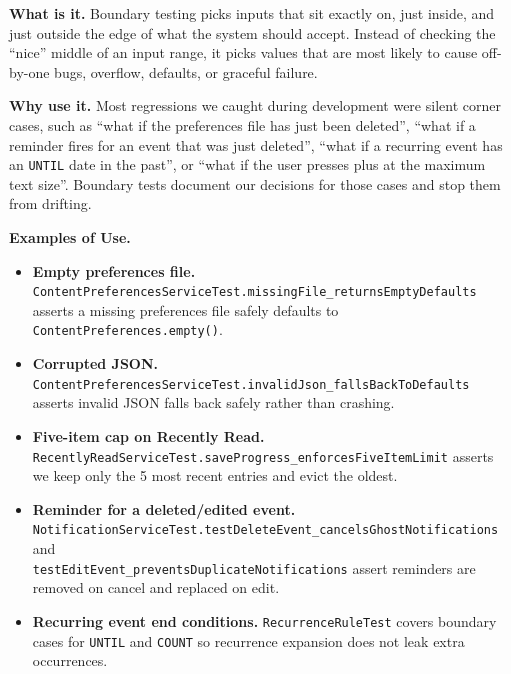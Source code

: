 \documentclass[a4paper, 12pt]{article}
\begin{document}
    \textbf{What is it.} Boundary testing picks inputs that sit exactly on, just
    inside, and just outside the edge of what the system should accept. Instead of
    checking the ``nice'' middle of an input range, it picks values that are
    most likely to cause off-by-one bugs, overflow, defaults, or graceful failure.

    \textbf{Why use it.} Most regressions we caught during development were
    silent corner cases, such as ``what if the preferences file has just been deleted'',
    ``what if a reminder fires for an event that was just deleted'', ``what if a
    recurring event has an \texttt{UNTIL} date in the past'', or ``what if the user
    presses plus at the maximum text size''. Boundary tests document our
    decisions for those cases and stop them from drifting.

    \textbf{Examples of Use.}

    \begin{itemize}
        \item \textbf{Empty preferences file.} \\
            \texttt{ContentPreferencesServiceTest.missingFile\_returnsEmptyDefaults}
            asserts a missing preferences file safely defaults to \texttt{ContentPreferences.empty()}.

        \item \textbf{Corrupted JSON.} \\
            \texttt{ContentPreferencesServiceTest.invalidJson\_fallsBackToDefaults}
            asserts invalid JSON falls back safely rather than crashing.

        \item \textbf{Five-item cap on Recently Read.} \\
            \texttt{RecentlyReadServiceTest.saveProgress\_enforcesFiveItemLimit}
            asserts we keep only the 5 most recent entries and evict the oldest.

        \item \textbf{Reminder for a deleted/edited event.} \\
            \texttt{NotificationServiceTest.testDeleteEvent\_cancelsGhostNotifications}
            and \\
            \texttt{testEditEvent\_preventsDuplicateNotifications} assert
            reminders are removed on cancel and replaced on edit.

        \item \textbf{Recurring event end conditions.} \texttt{RecurrenceRuleTest}
            covers boundary cases for \texttt{UNTIL} and \texttt{COUNT} so recurrence
            expansion does not leak extra occurrences.
    \end{itemize}
\end{document}
